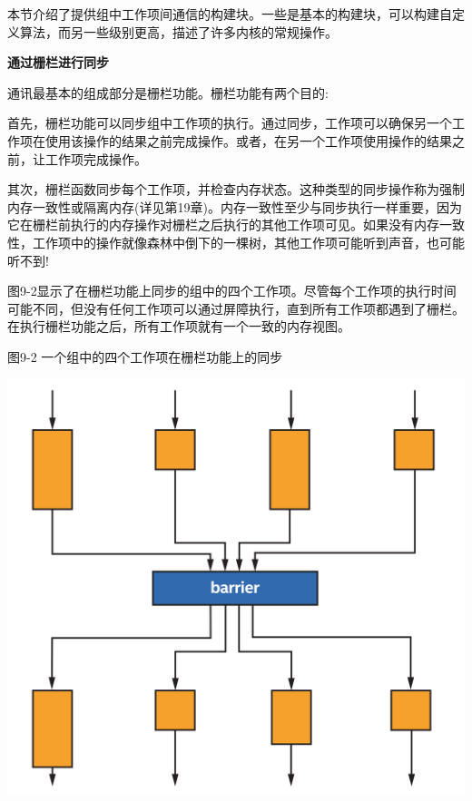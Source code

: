 本节介绍了提供组中工作项间通信的构建块。一些是基本的构建块，可以构建自定义算法，而另一些级别更高，描述了许多内核的常规操作。\par

\hspace*{\fill} \par %
\textbf{通过栅栏进行同步}

通讯最基本的组成部分是栅栏功能。栅栏功能有两个目的:\par

首先，栅栏功能可以同步组中工作项的执行。通过同步，工作项可以确保另一个工作项在使用该操作的结果之前完成操作。或者，在另一个工作项使用操作的结果之前，让工作项完成操作。\par

其次，栅栏函数同步每个工作项，并检查内存状态。这种类型的同步操作称为强制内存一致性或隔离内存(详见第19章)。内存一致性至少与同步执行一样重要，因为它在栅栏前执行的内存操作对栅栏之后执行的其他工作项可见。如果没有内存一致性，工作项中的操作就像森林中倒下的一棵树，其他工作项可能听到声音，也可能听不到!\par

图9-2显示了在栅栏功能上同步的组中的四个工作项。尽管每个工作项的执行时间可能不同，但没有任何工作项可以通过屏障执行，直到所有工作项都遇到了栅栏。在执行栅栏功能之后，所有工作项就有一个一致的内存视图。\par

\hspace*{\fill} \par %
图9-2 一个组中的四个工作项在栅栏功能上的同步
\begin{center}
	\includegraphics[width=1.\textwidth]{content/chapter-9/images/3}
\end{center}

